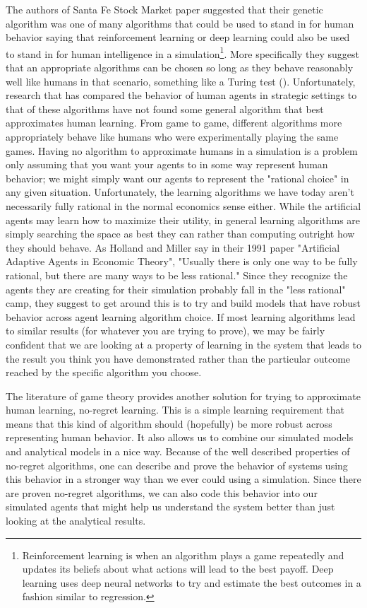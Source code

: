 \documentclass[12pt,twoside]{reedthesis}
\begin{document}
The authors of Santa Fe Stock Market paper suggested that their genetic algorithm was one of many algorithms that could be used to stand in for human behavior saying that reinforcement learning or deep learning could also be used to stand in for human intelligence in a simulation\footnote{Reinforcement learning is when an algorithm plays a game repeatedly and updates its beliefs about what actions will lead to the best payoff. Deep learning uses deep neural networks to try and estimate the best outcomes in a fashion similar to regression.}. More specifically they suggest that an appropriate algorithms can be chosen so long as they behave reasonably well like humans in that scenario, something like a Turing test (\cite{Arthur1991}).  Unfortunately, research that has compared the behavior of human agents in strategic settings to that of these algorithms have not found some general algorithm that best approximates human learning. From game to game, different algorithms more appropriately behave like humans who were experimentally playing the same games\citep{Tesfatsion2002}. Having no algorithm to approximate humans in a simulation is a problem only assuming that you want your agents to in some way represent human behavior; we might simply want our agents to represent the "rational choice" in any given situation. Unfortunately, the learning algorithms we have today aren't necessarily fully rational in the normal economics sense either. While the artificial agents may learn how to maximize their utility, in general learning algorithms are simply searching the space as best they can rather than computing outright how they should behave. As Holland and Miller say in their 1991 paper "Artificial Adaptive Agents in Economic Theory", "Usually there is only one way to be fully rational, but there are many ways to be less rational." Since they recognize the agents they are creating for their simulation probably fall in the "less rational" camp, they suggest to get around this is to try and build models that have robust behavior across agent learning algorithm choice. If most learning algorithms lead to similar results (for whatever you are trying to prove), we may be fairly confident that we are looking at a property of learning in the system that leads to the result you think you have demonstrated rather than the particular outcome reached by the specific algorithm you choose.


The literature of game theory provides another solution for trying to approximate human learning, no-regret learning. This is a simple learning requirement that means that this kind of algorithm should (hopefully) be more robust across representing human behavior. It also allows us to combine our simulated models and analytical models in a nice way. Because of the well described properties of no-regret algorithms, one can describe and prove the behavior of systems using this behavior in a stronger way than we ever could using a simulation. Since there are proven no-regret algorithms, we can also code this behavior into our simulated agents that might help us understand the system better than just looking at the analytical results.
\end{document}

